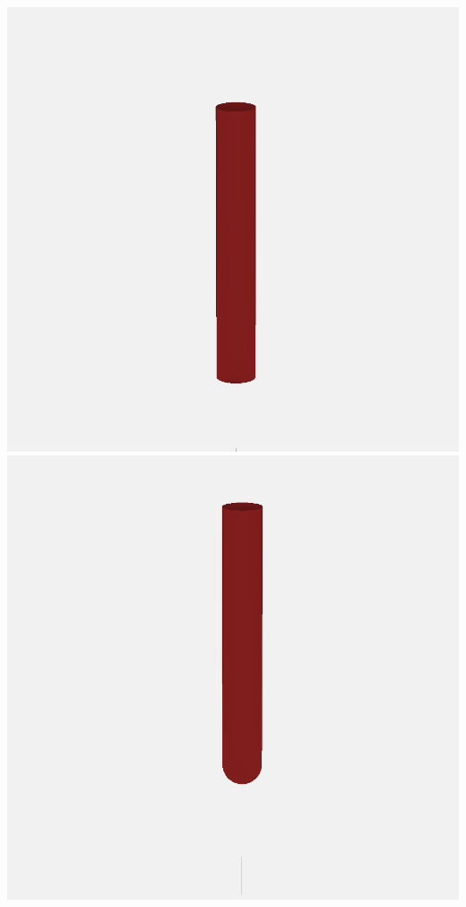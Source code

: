 \documentclass{ltxdoc}
\begin{document}
\begin{samepage}
  \noindent\includegraphics[width=\linewidth/3]{images/tool_square_201.png}%
           \includegraphics[width=\linewidth/3]{images/tool_ball_202.png}%

\end{samepage}
\end{document}
